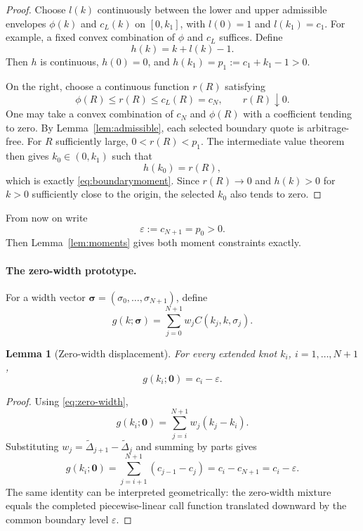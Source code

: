 \documentclass[11pt]{article}
\newtheorem{lemma}[theorem]{Lemma}
\newcommand{\eps}{\varepsilon}
\begin{document}
\begin{proof}
Choose $l(k)$ continuously between the lower and upper admissible envelopes $\phi(k)$ and $c_L(k)$ on $[0,k_1]$, with $l(0)=1$ and $l(k_1)=c_1$. For example, a fixed convex combination of $\phi$ and $c_L$ suffices. Define
\[
h(k)=k+l(k)-1.
\]
Then $h$ is continuous, $h(0)=0$, and $h(k_1)=p_1:=c_1+k_1-1>0$.

On the right, choose a continuous function $r(R)$ satisfying
\[
\phi(R)\le r(R)\le c_L(R)=c_N,
\qquad r(R)\downarrow0.
\]
One may take a convex combination of $c_N$ and $\phi(R)$ with a coefficient tending to zero. By Lemma~\ref{lem:admissible}, each selected boundary quote is arbitrage-free. For $R$ sufficiently large, $0<r(R)<p_1$. The intermediate value theorem then gives $k_0\in(0,k_1)$ such that
\[
h(k_0)=r(R),
\]
which is exactly \eqref{eq:boundarymoment}. Since $r(R)\to0$ and $h(k)>0$ for $k>0$ sufficiently close to the origin, the selected $k_0$ also tends to zero.
\end{proof}

From now on write
\[
\eps:=c_{N+1}=p_0>0.
\]
Then Lemma~\ref{lem:moments} gives both moment constraints exactly.

\paragraph{The zero-width prototype.}
For a width vector $\bm\sigma=(\sigma_0,\ldots,\sigma_{N+1})$, define
\begin{equation}
g(k;\bm\sigma)=\sum_{j=0}^{N+1}w_jC(k_j,k,\sigma_j).
\label{eq:gmixture}
\end{equation}

\begin{lemma}[Zero-width displacement]\label{lem:zero}
For every extended knot $k_i$, $i=1,\ldots,N+1$,
\begin{equation}
g(k_i;\bm0)=c_i-\eps.
\label{eq:zerodisplacement}
\end{equation}
\end{lemma}

\begin{proof}
Using \eqref{eq:zero-width},
\[
g(k_i;\bm0)=\sum_{j=i}^{N+1}w_j(k_j-k_i).
\]
Substituting $w_j=\widetilde\Delta_{j+1}-\widetilde\Delta_j$ and summing by parts gives
\[
g(k_i;\bm0)
=\sum_{j=i+1}^{N+1}(c_{j-1}-c_j)
=c_i-c_{N+1}=c_i-\eps.
\]
The same identity can be interpreted geometrically: the zero-width mixture equals the completed piecewise-linear call function translated downward by the common boundary level $\eps$.
\end{proof}
\end{document}
